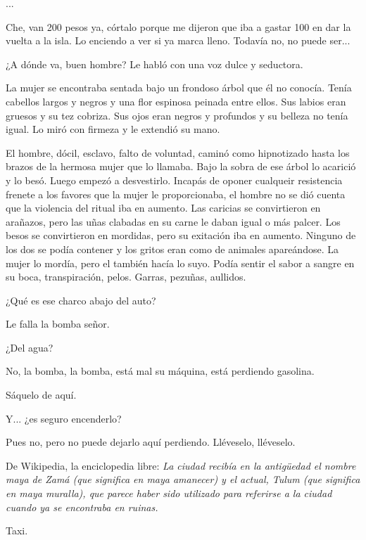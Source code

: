 \documentclass[11pt,twoside,openright,a6paper]{book}
\begin{document}
...

Che, van 200 pesos ya, córtalo porque me dijeron que iba a gastar 100 en dar la vuelta a la isla. Lo enciendo a ver si ya marca lleno. Todavía no, no puede ser...


\vspace{1.5cm}
¿A dónde va, buen hombre? Le habló con una voz dulce y seductora.

La mujer se encontraba sentada bajo un frondoso árbol que él no conocía. Tenía cabellos largos y negros y una flor espinosa peinada entre ellos. Sus labios eran gruesos y su tez cobriza. Sus ojos eran negros y profundos y su belleza no tenía igual. Lo miró con firmeza y le extendió su mano.

El hombre, dócil, esclavo, falto de voluntad, caminó como hipnotizado hasta los brazos de la hermosa mujer que lo llamaba. Bajo la sobra de ese árbol lo acarició y lo besó. Luego empezó a desvestirlo. Incapás de oponer cualqueir resistencia frenete a los favores que la mujer le proporcionaba, el hombre no se dió cuenta que la violencia del ritual iba en aumento. Las caricias se convirtieron en arañazos, pero las uñas clabadas en su carne le daban igual o más palcer. Los besos se convirtieron en mordidas, pero su exitación iba en aumento. Ninguno de los dos se podía contener y los gritos eran como de animales apareándose. La mujer lo mordía, pero el también hacía lo suyo. Podía sentir el sabor a sangre en su boca, transpiración, pelos. Garras, pezuñas, aullidos.


\vspace{1.5cm}
¿Qué es ese charco abajo del auto?

Le falla la bomba señor.

¿Del agua?

No, la bomba, la bomba, está mal su máquina, está perdiendo gasolina.


\vspace{1.5cm}
Sáquelo de aquí.

Y... ¿es seguro encenderlo?

Pues no, pero no puede dejarlo aquí perdiendo. Lléveselo, lléveselo.


\vspace{1.5cm}
De Wikipedia, la enciclopedia libre: \emph{La ciudad recibía en la antigüedad el nombre maya de Zamá (que significa en maya amanecer) y el actual, Tulum (que significa en maya muralla), que parece haber sido utilizado para referirse a la ciudad cuando ya se encontraba en ruinas.}


\vspace{1.5cm}
Taxi.
\end{document}
